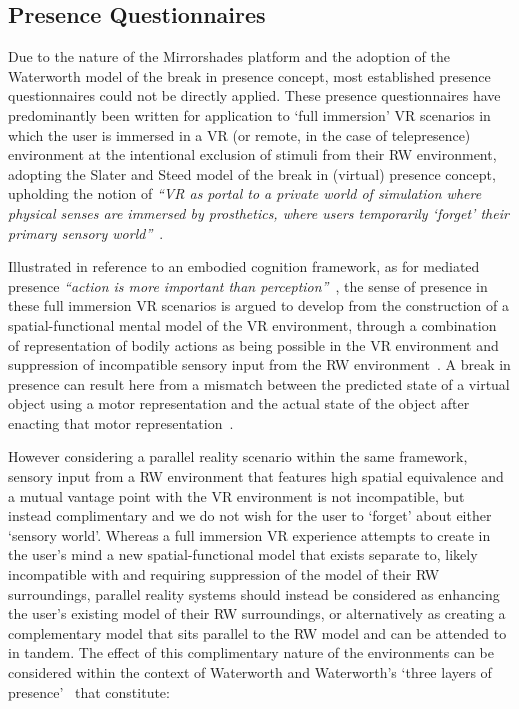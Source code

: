 \subsection{Presence Questionnaires}
\label{presence-questionnaires}
Due to the nature of the Mirrorshades platform and the adoption of the Waterworth model of the break in presence concept, most established presence questionnaires could not be directly applied. These presence questionnaires have predominantly been written for application to `full immersion' VR scenarios in which the user is immersed in a VR (or remote, in the case of telepresence) environment at the intentional exclusion of stimuli from their RW environment, adopting the Slater and Steed model of the break in (virtual) presence concept, upholding the notion of \textit{``VR as portal to a private world of simulation where physical senses are immersed by prosthetics, where users temporarily `forget' their primary sensory world''}~\cite{Heim2014}.

Illustrated in reference to an embodied cognition framework, as for mediated presence \textit{``action is more important than perception''}~\cite{Giuseppe2014}, the sense of presence in these full immersion VR scenarios is argued to develop from the construction of a spatial-functional mental model of the VR environment, through a combination of representation of bodily actions as being possible in the VR environment and suppression of incompatible sensory input from the RW environment~\cite{Schubert2001}. A break in presence can result here from a mismatch between the predicted state of a virtual object using a motor representation and the actual state of the object after enacting that motor representation~\cite{Giuseppe2014}.

However considering a parallel reality scenario within the same framework, sensory input from a RW environment that features high spatial equivalence and a mutual vantage point with the VR environment is not incompatible, but instead complimentary and we do not wish for the user to `forget' about either `sensory world'. Whereas a full immersion VR experience attempts to create in the user's mind a new spatial-functional model that exists separate to, likely incompatible with and requiring suppression of the model of their RW surroundings, parallel reality systems should instead be considered as enhancing the user's existing model of their RW surroundings, or alternatively as creating a complementary model that sits parallel to the RW model and can be attended to in tandem. The effect of this complimentary nature of the environments can be considered within the context of Waterworth and Waterworth's `three layers of presence'~\cite{Mantovani2010, Giuseppe2014} that constitute:

